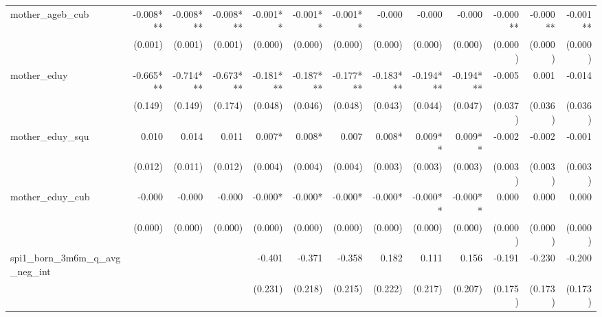 \begin{tabular}{lrrrrrrrrrrrr}
mother\_ageb\_cub                           &    -0.008*** &    -0.008*** &    -0.008*** &     -0.001** &     -0.001** &     -0.001** &       -0.000 &       -0.000 &       -0.000 &     -0.000** &     -0.000** &     -0.001** \\ 
                                            &      (0.001) &      (0.001) &      (0.001) &      (0.000) &      (0.000) &      (0.000) &      (0.000) &      (0.000) &      (0.000) &      (0.000) &      (0.000) &      (0.000) \\ 
mother\_eduy                                &    -0.665*** &    -0.714*** &    -0.673*** &    -0.181*** &    -0.187*** &    -0.177*** &    -0.183*** &    -0.194*** &    -0.194*** &       -0.005 &        0.001 &       -0.014 \\ 
                                            &      (0.149) &      (0.149) &      (0.174) &      (0.048) &      (0.046) &      (0.048) &      (0.043) &      (0.044) &      (0.047) &      (0.037) &      (0.036) &      (0.036) \\ 
mother\_eduy\_squ                           &        0.010 &        0.014 &        0.011 &       0.007* &       0.008* &        0.007 &       0.008* &      0.009** &      0.009** &       -0.002 &       -0.002 &       -0.001 \\ 
                                            &      (0.012) &      (0.011) &      (0.012) &      (0.004) &      (0.004) &      (0.004) &      (0.003) &      (0.003) &      (0.003) &      (0.003) &      (0.003) &      (0.003) \\ 
mother\_eduy\_cub                           &       -0.000 &       -0.000 &       -0.000 &      -0.000* &      -0.000* &      -0.000* &      -0.000* &     -0.000** &     -0.000** &        0.000 &        0.000 &        0.000 \\ 
                                            &      (0.000) &      (0.000) &      (0.000) &      (0.000) &      (0.000) &      (0.000) &      (0.000) &      (0.000) &      (0.000) &      (0.000) &      (0.000) &      (0.000) \\ 
spi1\_born\_3m6m\_q\_avg\_neg\_int          &              &              &              &       -0.401 &       -0.371 &       -0.358 &        0.182 &        0.111 &        0.156 &       -0.191 &       -0.230 &       -0.200 \\ 
                                            &              &              &              &      (0.231) &      (0.218) &      (0.215) &      (0.222) &      (0.217) &      (0.207) &      (0.175) &      (0.173) &      (0.173) \\ 

\end{tabular}
